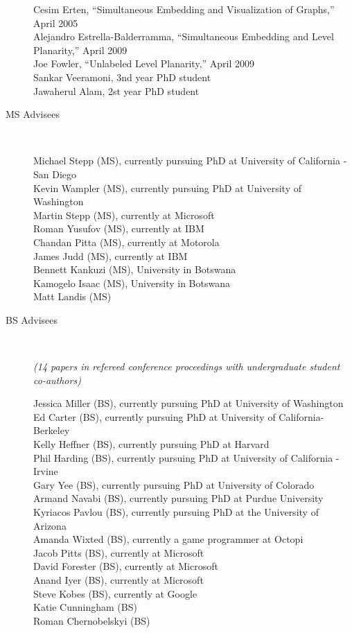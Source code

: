 \documentclass[10pt]{article}
\begin{document}
\begin{description}
Cesim Erten, ``Simultaneous Embedding and Visualization of Graphs,'' April 2005\\
Alejandro Estrella-Balderramma, ``Simultaneous Embedding and Level Planarity,'' April 2009\\
Joe Fowler, ``Unlabeled Level Planarity,'' April 2009\\
Sankar Veeramoni, 3nd year PhD student\\
Jawaherul Alam, 2st year PhD student

\vspace{0cm}\item [MS Advisees]\

Michael Stepp (MS), currently pursuing PhD at University of California - San Diego\\
Kevin Wampler (MS), currently pursuing PhD at University of Washington\\
Martin Stepp (MS), currently at Microsoft\\
Roman Yusufov (MS), currently at IBM\\
Chandan Pitta (MS), currently at Motorola\\
James Judd (MS), currently at IBM\\
Bennett Kankuzi (MS), University in Botswana\\
Kamogelo Isaac (MS), University in Botswana\\
Matt Landis (MS)

\vspace{-.0cm}\item [BS Advisees]\

{\em (14 papers in refereed conference proceedings with undergraduate student co-authors)}

Jessica Miller (BS), currently pursuing PhD at University of Washington\\
Ed Carter (BS), currently pursuing PhD at University of California-Berkeley\\
Kelly Heffner (BS), currently pursuing PhD at Harvard\\
Phil Harding (BS), currently pursuing PhD at University of California - Irvine\\
Gary Yee (BS), currently pursuing PhD at University of Colorado\\
Armand Navabi (BS), currently pursuing PhD at Purdue University\\
Kyriacos Pavlou (BS), currently pursuing PhD at the University of Arizona\\
Amanda Wixted (BS), currently a game programmer at Octopi\\
Jacob Pitts (BS), currently at Microsoft\\
David Forester (BS), currently at Microsoft\\
Anand Iyer (BS), currently at Microsoft\\
Steve Kobes (BS), currently at Google\\
Katie Cunningham (BS)\\
Roman Chernobelskyi (BS)\\


\end{description}
\end{document}
